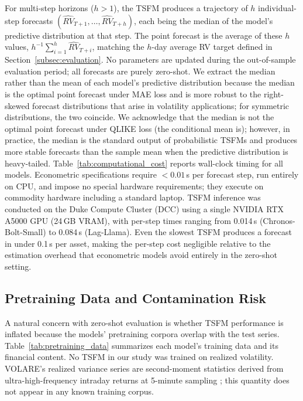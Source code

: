 \documentclass[12pt]{article}
\begin{document}
For multi-step horizons ($h > 1$), the TSFM produces a trajectory of $h$ individual-step forecasts $(\widehat{RV}_{T+1}, \ldots, \widehat{RV}_{T+h})$, each being the median of the model's predictive distribution at that step. The point forecast is the average of these $h$ values, $h^{-1}\sum_{i=1}^{h} \widehat{RV}_{T+i}$, matching the $h$-day average RV target defined in Section~\ref{subsec:evaluation}. No parameters are updated during the out-of-sample evaluation period; all forecasts are purely zero-shot. We extract the median rather than the mean of each model's predictive distribution because the median is the optimal point forecast under MAE loss and is more robust to the right-skewed forecast distributions that arise in volatility applications; for symmetric distributions, the two coincide. We acknowledge that the median is not the optimal point forecast under QLIKE loss (the conditional mean is); however, in practice, the median is the standard output of probabilistic TSFMs and produces more stable forecasts than the sample mean when the predictive distribution is heavy-tailed. Table~\ref{tab:computational_cost} reports wall-clock timing for all models. Econometric specifications require $< 0.01$\,s per forecast step, run entirely on CPU, and impose no special hardware requirements; they execute on commodity hardware including a standard laptop. TSFM inference was conducted on the Duke Compute Cluster (DCC) using a single NVIDIA RTX A5000 GPU (24\,GB VRAM), with per-step times ranging from 0.014\,s (Chronos-Bolt-Small) to 0.084\,s (Lag-Llama). Even the slowest TSFM produces a forecast in under 0.1\,s per asset, making the per-step cost negligible relative to the estimation overhead that econometric models avoid entirely in the zero-shot setting.



\subsection{Pretraining Data and Contamination Risk}
\label{subsec:contamination}

A natural concern with zero-shot evaluation is whether TSFM performance is inflated because the models' pretraining corpora overlap with the test series. Table~\ref{tab:pretraining_data} summarizes each model's training data and its financial content. No TSFM in our study was trained on realized volatility. VOLARE's realized variance series are second-moment statistics derived from ultra-high-frequency intraday returns at 5-minute sampling \citep{volare2026}; this quantity does not appear in any known training corpus.
\end{document}
